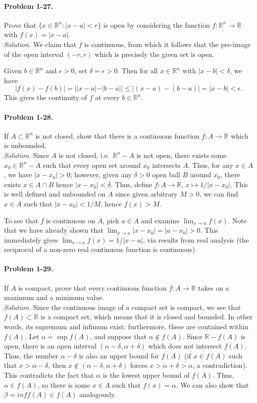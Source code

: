 \documentclass[11pt]{report}
\newcommand{\R}{\mathbb{R}}
\newcommand{\problem}[1]{\paragraph{Problem #1.}}
\newcommand{\solution}{\noindent\textit{Solution.} }
\begin{document}
    \problem{1-27} Prove that $\{x \in \R^n : |x - a| < r\}$ is open by considering
    the function $f\colon \R^n \to \R$ with $f(x) = |x - a|$. \\

    \solution We claim that $f$ is continuous, from which it follows that the
    pre-image of the open interval $(-r, r)$ which is precisely the given set is
    open.

    Given $b \in \R^n$ and $\epsilon > 0$, set $\delta = \epsilon > 0$. Then for all
    $x \in \R^n$ with $|x - b| < \delta$, we have \[
        |f(x) - f(b)| = | |x - a| - |b - a| | \leq |(x - a) - (b - a)| = |x - b| <
        \epsilon.
    \] This gives the continuity of $f$ at every $b \in \R^n$.


    \problem{1-28} If $A \subset \R^n$ is not closed, show that there is a continuous
    function $f\colon A \to \R$ which is unbounded. \\

    \solution Since $A$ is not closed, i.e.\ $\R^n - A$ is not open, there exists
    some $x_0 \in \R^n - A$ such that every open set around $x_0$ intersects $A$. Thus,
    for any $x \in A$, we have $|x - x_0| > 0$; however, given any $\delta > 0$
    open ball $B$ around $x_0$, there exists $x \in A \cap B$ hence $|x - x_0| <
    \delta$. Thus, define $f\colon A \to \R$, $x \mapsto  1 / |x - x_0|$. This is
    well defined and unbounded on $A$ since given arbitrary $M > 0$, we can find $x
    \in A$ such that $|x - x_0| < 1 / M$, hence $f(x) > M$.

    To see that $f$ is continuous on $A$, pick $a \in A$ and examine $\lim_{x \to a}
    f(x)$. Note that we have already shown that $\lim_{x \to a} |x - x_0| = |a - x_0|
    > 0$. This immediately gives $\lim_{x \to a} f(x) = 1 / |x - a|$, via results
    from real analysis (the reciprocal of a non-zero real continuous function is
    continuous).


    \problem{1-29} If $A$ is compact, prove that every continuous function $f\colon A
    \to \R$ takes on a maximum and a minimum value. \\

    \solution Since the continuous image of a compact set is compact, we see that
    $f(A) \subset \R$ is a compact set, which means that it is closed and bounded. In
    other words, its supremum and infimum exist: furthermore, these are contained
    within $f(A)$. Let $\alpha = \sup{f(A)}$, and suppose that $\alpha \notin f(A)$.
    Since $\R - f(A)$ is open, there is an open interval $(\alpha - \delta, \alpha +
    \delta)$ which does not intersect $f(A)$. Thus, the number $\alpha - \delta$
    is also an upper bound for $f(A)$ (if $x \in f(A)$ such that $x > \alpha -
    \delta$, then $x \notin (\alpha - \delta, \alpha + \delta)$ forces $x > \alpha +
    \delta > \alpha$, a contradiction). This contradicts the fact that $\alpha$ is
    the lowest upper bound of $f(A)$. Thus, $\alpha \in f(A)$, so there is some $x
    \in A$ such that $f(x) = \alpha$. We can also show that $\beta = inf{f(A)} \in
    f(A)$ analogously.
\end{document}
